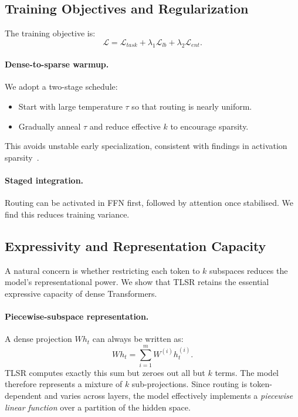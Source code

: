 \documentclass{article}
\theoremstyle{plain}
\theoremstyle{definition}
\theoremstyle{remark}
\begin{document}
\subsection{Training Objectives and Regularization}

The training objective is:
\begin{equation}
\mathcal{L} = \mathcal{L}_{task} + \lambda_1 \mathcal{L}_{lb}
             + \lambda_2 \mathcal{L}_{ent}.
\end{equation}

\paragraph{Dense-to-sparse warmup.}
We adopt a two-stage schedule:

\begin{itemize}
\item Start with large temperature $\tau$ so that routing is nearly uniform.
\item Gradually anneal $\tau$ and reduce effective $k$ to encourage sparsity.
\end{itemize}

This avoids unstable early specialization, consistent with findings in activation sparsity~\cite{zhang2024activationsparsitypretrain}.

\paragraph{Staged integration.}
Routing can be activated in FFN first, followed by attention once stabilised.
We find this reduces training variance.

\subsection{Expressivity and Representation Capacity}

A natural concern is whether restricting each token to $k$ subspaces reduces
the model’s representational power.
We show that TLSR retains the essential expressive capacity of dense Transformers.

\paragraph{Piecewise-subspace representation.}
A dense projection $W h_t$ can always be written as:
\[
W h_t = \sum_{i=1}^m W^{(i)} h_t^{(i)}.
\]
TLSR computes exactly this sum but zeroes out all but $k$ terms.
The model therefore represents a mixture of $k$ sub-projections.
Since routing is token-dependent and varies across layers,
the model effectively implements a \emph{piecewise linear function}
over a partition of the hidden space.
\end{document}
